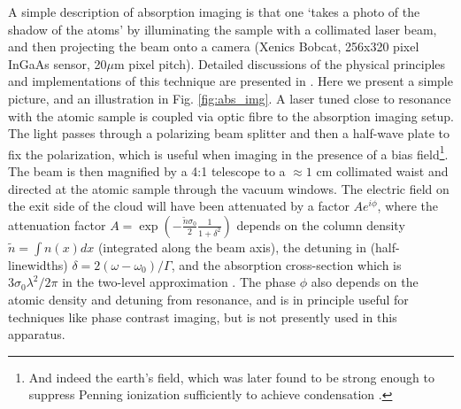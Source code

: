 	A simple description of absorption imaging is that one `takes a photo of the shadow of the atoms' by illuminating the sample with a collimated laser beam, and then projecting the beam onto a camera (Xenics Bobcat, 256x320 pixel InGaAs sensor, 20$\mu$m pixel pitch).	
	Detailed discussions of the physical principles and implementations of this technique are presented in \cite{MakingProbingUnderstanding,TychkovThesis}.
	Here we present a simple picture, and an illustration in Fig. \ref{fig:abs_img}.
	A laser tuned close to resonance with the atomic sample is coupled via optic fibre to the absorption imaging setup.
	The light passes through a polarizing beam splitter and then a half-wave plate to fix the polarization, which is useful when imaging in the presence of a bias field\footnote{And indeed the earth's field, which was later found to be strong enough to suppress Penning ionization sufficiently to achieve condensation \cite{Abbas21}.}.
	The beam is then magnified by a 4:1 telescope to a $\approx1$ cm collimated waist and directed at the atomic sample through the vacuum windows.
	The electric field on the exit side of the cloud will have been attenuated by a factor $Ae^{i\phi}$, where the attenuation factor $A=\exp(-\frac{\tilde{n}\sigma_0}{2}\frac{1}{1+\delta^2})$ depends on the column density  $\tilde{n} = \int n(x) dx$ (integrated along the beam axis), the detuning in (half-linewidths) $\delta=2(\omega-\omega_0)/\Gamma$, and the absorption cross-section which is $3\sigma_0\lambda^2/2\pi$ in the two-level approximation \cite{MakingProbingUnderstanding}.
	The phase $\phi$ also depends on the atomic density and detuning from resonance, and is in principle useful for techniques like phase contrast imaging, but is not presently used in this apparatus.

